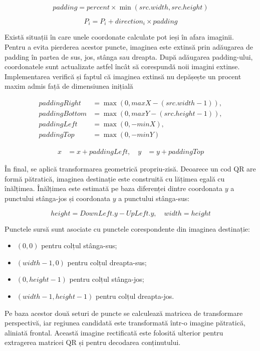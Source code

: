 \[
    padding = percent \times \min(src.width, src.height)
\]

\[
    P_i = P_i + direction_i \times padding
\]

Există situații în care unele coordonate calculate pot ieși în afara imaginii. Pentru a evita pierderea acestor puncte, imaginea este extinsă prin adăugarea de padding în partea de sus, jos, stânga sau dreapta. După adăugarea padding-ului, coordonatele sunt actualizate astfel încât să corespundă noii imagini extinse. Implementarea verifică și faptul că imaginea extinsă nu depășește un procent maxim admis față de dimensiunea inițială

\[
    \begin{aligned}
        paddingRight  &= \max(0, maxX - (src.width - 1)), \\
        paddingBottom &= \max(0, maxY - (src.height - 1)), \\
        paddingLeft   &= \max(0, -minX), \\
        paddingTop    &= \max(0, -minY)
    \end{aligned}
\]

\[
    \begin{aligned}
        x &= x + paddingLeft, \quad
        y &= y + paddingTop
    \end{aligned}
\]

În final, se aplică transformarea geometrică propriu-zisă. Deoarece un cod QR are formă pătratică, imaginea destinație este construită cu lățimea egală cu înălțimea. Înălțimea este estimată pe baza diferenței dintre coordonata $y$ a punctului stânga-jos și coordonata $y$ a punctului stânga-sus:

\[
    height = DownLeft.y - UpLeft.y, \quad
    width = height
\]

Punctele sursă sunt asociate cu punctele corespondente din imaginea destinație:

\begin{itemize}
    \item $(0, 0)$ pentru colțul stânga-sus;
    \item $(width - 1, 0)$ pentru colțul dreapta-sus;
    \item $(0, height - 1)$ pentru colțul stânga-jos;
    \item $(width - 1, height - 1)$ pentru colțul dreapta-jos.
\end{itemize}

Pe baza acestor două seturi de puncte se calculează matricea de transformare perspectivă, iar regiunea candidată este transformată într-o imagine pătratică, aliniată frontal. Această imagine rectificată este folosită ulterior pentru extragerea matricei QR și pentru decodarea conținutului.


